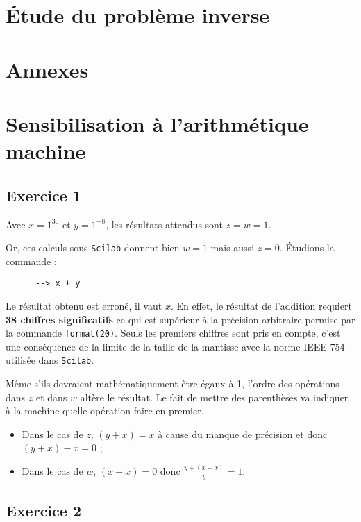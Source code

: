 \documentclass[a4paper,11pt]{article}
\theoremstyle{nonumberplain}
\begin{document}
\section{\'{E}tude du problème inverse}

\section*{Annexes}

\vspace{8cm}

\section{Sensibilisation à l'arithmétique machine}
\subsection*{Exercice 1}

    Avec $x = 1^{30}$ et $y = 1^{-8}$, les résultats attendus sont $z = w = 1$.

    Or, ces calculs sous \texttt{Scilab} donnent bien $w = 1$ mais aussi $z = 0$. \'{E}tudions la commande :
    \begin{verbatim}
      --> x + y
    \end{verbatim}
    Le résultat obtenu est erroné, il vaut $x$. En effet, le résultat de l'addition requiert \textbf{38 chiffres significatifs} ce qui est supérieur à la précision arbitraire permise par la commande \texttt{format(20)}.
    Seuls les premiers chiffres sont pris en compte, c'est une conséquence de la limite de la taille de la mantisse avec la norme IEEE 754 utilisée dans \texttt{Scilab}.
    \newline

    Même s'ils devraient mathématiquement être égaux à 1, l'ordre des opérations dans $z$ et dans $w$ altère le résultat.
    Le fait de mettre des parenthèses va indiquer à la machine quelle opération faire en premier.
    \begin{itemize}
        \item Dans le cas de $z$, $(y + x) = x$ à cause du manque de précision et donc $(y + x) - x = 0$ ;
        \item Dans le cas de $w$, $(x - x) = 0$ donc $\frac{y + (x -x)}{y} = 1$.
    \end{itemize}


\subsection*{Exercice 2}
\end{document}
